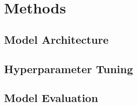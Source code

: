 \documentclass[10pt]{article}
\begin{document}

\section{Methods}



\subsection{Model Architecture}




\subsection{Hyperparameter Tuning}



\subsection{Model Evaluation}
\end{document}
